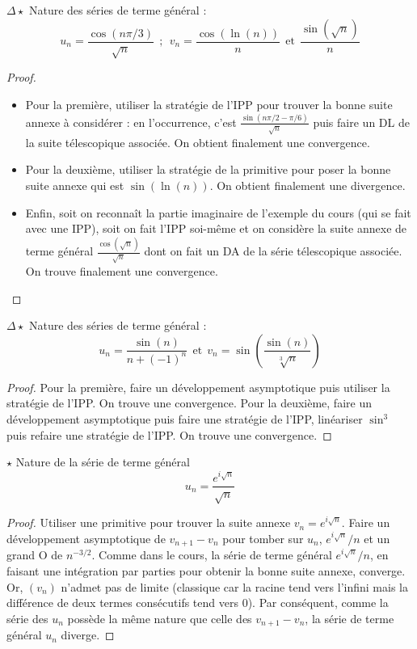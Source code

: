 \documentclass[french,a4paper]{article}
\theoremstyle{plain}
\theoremstyle{definition}
\theoremstyle{remark}
\begin{document}
\begin{ex}[Moulin.34]{$\Delta\star$}
	Nature des séries de terme général :
	$$u_n=\frac{\cos(n\pi/3)}{\sqrt{n}}\ \ ; \ \ v_n=\frac{\cos(\ln(n))}{n}\ \ \text{et} \ \ \frac{\sin(\sqrt{n})}{n}$$
\end{ex}
\begin{proof}
	\begin{itemize}
		\item Pour la première, utiliser la stratégie de l'IPP pour trouver la bonne suite annexe à considérer : en l'occurrence, c'est $\displaystyle\frac{\sin(n\pi/2-\pi/6)}{\sqrt{n}}$ puis faire un DL de la suite télescopique associée. On obtient finalement une convergence.
		\item Pour la deuxième, utiliser la stratégie de la primitive pour poser la bonne suite annexe qui est $\sin(\ln(n))$. On obtient finalement une divergence.
		\item Enfin, soit on reconnaît la partie imaginaire de l'exemple du cours (qui se fait avec une IPP), soit on fait l'IPP soi-même et on considère la suite annexe de terme général $\displaystyle\frac{\cos(\sqrt{n})}{\sqrt{n}}$ dont on fait un DA de la série télescopique associée. On trouve finalement une convergence.
	\end{itemize}
\end{proof}

\begin{ex}[Moulin.35]{$\Delta\star$}
	Nature des séries de terme général : 
	$$u_n=\frac{\sin(n)}{n+(-1)^n}\ \ \text{et} \ \ v_n=\sin\left(\frac{\sin(n)}{\sqrt[3]{n}}\right)$$
\end{ex}
\begin{proof}
	Pour la première, faire un développement asymptotique puis utiliser la stratégie de l'IPP. On trouve une convergence. Pour la deuxième, faire un développement asymptotique puis faire une stratégie de l'IPP, linéariser $\sin^3$ puis refaire une stratégie de l'IPP. On trouve une convergence.
\end{proof}

\begin{ex}[Moulin.36]{$\star$}
	Nature de la série de terme général $$u_n=\frac{e^{i\sqrt{n}}}{\sqrt{n}}$$
\end{ex}
\begin{proof}
	Utiliser une primitive pour trouver la suite annexe $v_n=e^{i\sqrt{n}}$. Faire un développement asymptotique de $v_{n+1}-v_n$ pour tomber sur $u_n$, $e^{i\sqrt{n}}/n$ et un grand O de $n^{-3/2}$. Comme dans le cours, la série de terme général $e^{i\sqrt{n}}/n$, en faisant une intégration par parties pour obtenir la bonne suite annexe, converge. Or, $(v_n)$ n'admet pas de limite (classique car la racine tend vers l'infini mais la différence de deux termes consécutifs tend vers 0). Par conséquent, comme la série des $u_n$ possède la même nature que celle des $v_{n+1}-v_n$, la série de terme général $u_n$ diverge.
\end{proof}
\end{document}
